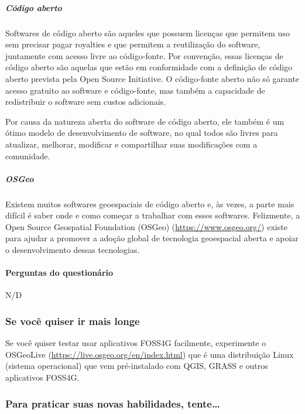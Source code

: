 \documentclass[
]{book}
\theoremstyle{definition}
\theoremstyle{definition}
\theoremstyle{definition}
\theoremstyle{definition}
\theoremstyle{remark}
\begin{document}
\hypertarget{cuxf3digo-aberto}{%
\subparagraph{Código aberto}\label{cuxf3digo-aberto}}

Softwares de código aberto são aqueles que possuem licenças que permitem uso sem precisar pagar royalties e que permitem a reutilização do software, juntamente com acesso livre ao código-fonte. Por convenção, essas licenças de código aberto são aquelas que estão em conformidade com a definição de código aberto prevista pela Open Source Initiative. O código-fonte aberto não só garante acesso gratuito ao software e código-fonte, mas também a capacidade de redistribuir o software sem custos adicionais.

Por causa da natureza aberta do software de código aberto, ele também é um ótimo modelo de desenvolvimento de software, no qual todos são livres para atualizar, melhorar, modificar e compartilhar suas modificações com a comunidade.

\hypertarget{osgeo}{%
\subparagraph{OSGeo}\label{osgeo}}

Existem muitos softwares geoespaciais de código aberto e, às vezes, a parte mais difícil é saber onde e como começar a trabalhar com esses softwares. Felizmente, a Open Source Geospatial Foundation (OSGeo) (\url{https://www.osgeo.org/}) existe para ajudar a promover a adoção global de tecnologia geoespacial aberta e apoiar o desenvolvimento dessas tecnologias.

\hypertarget{perguntas-do-questionuxe1rio-1}{%
\paragraph{Perguntas do questionário}\label{perguntas-do-questionuxe1rio-1}}

N/D

\hypertarget{se-vocuxea-quiser-ir-mais-longe}{%
\subsubsection{Se você quiser ir mais longe}\label{se-vocuxea-quiser-ir-mais-longe}}

Se você quiser testar usar aplicativos FOSS4G facilmente, experimente o OSGeoLive (\url{https://live.osgeo.org/en/index.html}) que é uma distribuição Linux (sistema operacional) que vem pré-instalado com QGIS, GRASS e outros aplicativos FOSS4G.

\hypertarget{para-praticar-suas-novas-habilidades-tente}{%
\subsubsection{Para praticar suas novas habilidades, tente\ldots{}}\label{para-praticar-suas-novas-habilidades-tente}}
\end{document}

